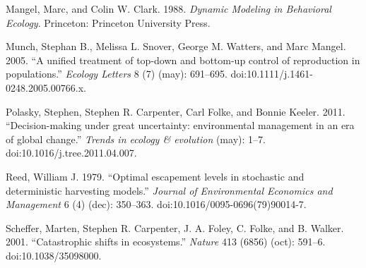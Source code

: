 \documentclass[author-year, review]{elsarticle} %
\begin{document}
Mangel, Marc, and Colin W. Clark. 1988. \emph{Dynamic Modeling in
Behavioral Ecology}. Princeton: Princeton University Press.

Munch, Stephan B., Melissa L. Snover, George M. Watters, and Marc
Mangel. 2005. ``A unified treatment of top-down and bottom-up control of
reproduction in populations.'' \emph{Ecology Letters} 8 (7) (may):
691--695. doi:10.1111/j.1461-0248.2005.00766.x.

Polasky, Stephen, Stephen R. Carpenter, Carl Folke, and Bonnie Keeler.
2011. ``Decision-making under great uncertainty: environmental
management in an era of global change.'' \emph{Trends in ecology \&
evolution} (may): 1--7. doi:10.1016/j.tree.2011.04.007.

Reed, William J. 1979. ``Optimal escapement levels in stochastic and
deterministic harvesting models.'' \emph{Journal of Environmental
Economics and Management} 6 (4) (dec): 350--363.
doi:10.1016/0095-0696(79)90014-7.

Scheffer, Marten, Stephen R. Carpenter, J. A. Foley, C. Folke, and B.
Walker. 2001. ``Catastrophic shifts in ecosystems.'' \emph{Nature} 413
(6856) (oct): 591--6. doi:10.1038/35098000.



\end{document}
